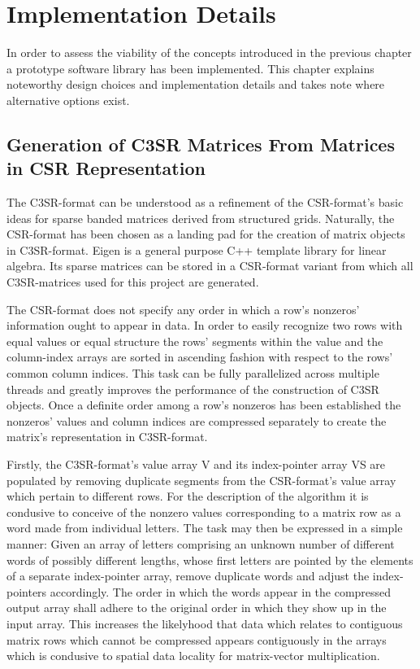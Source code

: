 \chapter{Implementation Details}

  In order to assess the viability of the concepts introduced in the previous chapter a prototype software library has
  been implemented. This chapter explains noteworthy design choices and implementation details and takes note where
  alternative options exist.

  \section{Generation of C3SR Matrices From Matrices in CSR Representation} \label{sec:gen-of-c3sr-from-csr}

    The C3SR-format can be understood as a refinement of the CSR-format's basic ideas for sparse banded matrices derived
    from structured grids. Naturally, the CSR-format has been chosen as a landing pad for the creation of matrix objects
    in C3SR-format. Eigen \cite{eigen:website} is a general purpose C++ template library for linear algebra. Its sparse
    matrices can be stored in a CSR-format variant from which all C3SR-matrices used for this project are generated.

    The CSR-format does not specify any order in which a row's nonzeros' information ought to appear in data. In order
    to easily recognize two rows with equal values or equal structure the rows' segments within the value and the
    column-index arrays are sorted in ascending fashion with respect to the rows' common column indices. This task can
    be fully parallelized across multiple threads and greatly improves the performance of the construction of C3SR
    objects. Once a definite order among a row's nonzeros has been established the nonzeros' values and column indices
    are compressed separately to create the matrix's representation in C3SR-format.

    Firstly, the C3SR-format's value array V and its index-pointer array VS are populated by removing duplicate segments
    from the CSR-format's value array which pertain to different rows. For the description of the algorithm it is
    condusive to conceive of the nonzero values corresponding to a matrix row as a word made from individual letters.
    The task may then be expressed in a simple manner: Given an array of letters comprising an unknown number of
    different words of possibly different lengths, whose first letters are pointed by the elements of a separate
    index-pointer array, remove duplicate words and adjust the index-pointers accordingly. The order in which the words
    appear in the compressed output array shall adhere to the original order in which they show up in the input array.
    This increases the likelyhood that data which relates to contiguous matrix rows which cannot be compressed appears
    contiguously in the arrays which is condusive to spatial data locality for matrix-vector multiplication.

